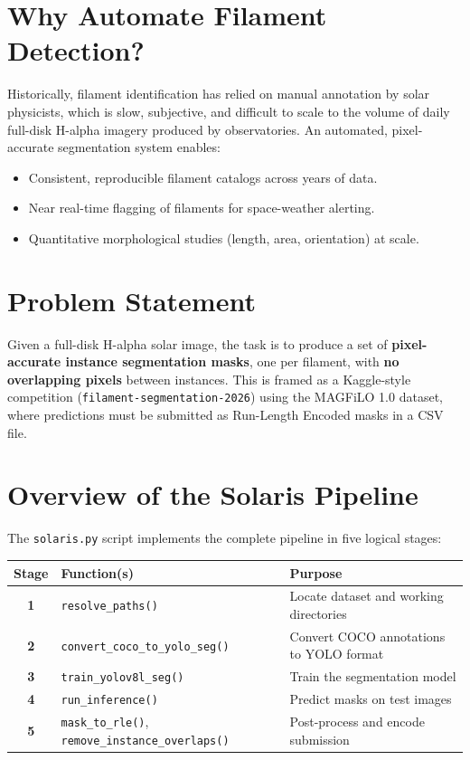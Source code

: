 \documentclass[11pt,a4paper,openany]{report}
\begin{document}
\section{Why Automate Filament Detection?}

Historically, filament identification has relied on manual annotation by solar physicists, which is
slow, subjective, and difficult to scale to the volume of daily full-disk H-alpha imagery produced
by observatories. An automated, pixel-accurate segmentation system enables:

\begin{itemize}
  \item Consistent, reproducible filament catalogs across years of data.
  \item Near real-time flagging of filaments for space-weather alerting.
  \item Quantitative morphological studies (length, area, orientation) at scale.
\end{itemize}

\section{Problem Statement}

Given a full-disk H-alpha solar image, the task is to produce a set of \textbf{pixel-accurate instance
segmentation masks}, one per filament, with \textbf{no overlapping pixels} between instances.
This is framed as a Kaggle-style competition (\texttt{filament-segmentation-2026}) using the
MAGFiLO 1.0 dataset, where predictions must be submitted as Run-Length Encoded masks in a
CSV file.

\section{Overview of the Solaris Pipeline}

The \texttt{solaris.py} script implements the complete pipeline in five logical stages:

\begin{center}
\renewcommand{\arraystretch}{1.3}
\begin{tabular}{>{\bfseries}c l l}
\toprule
Stage & Function(s) & Purpose \\
\midrule
1 & \texttt{resolve\_paths()} & Locate dataset and working directories \\
2 & \texttt{convert\_coco\_to\_yolo\_seg()} & Convert COCO annotations to YOLO format \\
3 & \texttt{train\_yolov8l\_seg()} & Train the segmentation model \\
4 & \texttt{run\_inference()} & Predict masks on test images \\
5 & \texttt{mask\_to\_rle()}, \texttt{remove\_instance\_overlaps()} & Post-process and encode submission \\
\bottomrule
\end{tabular}
\end{center}
\end{document}
